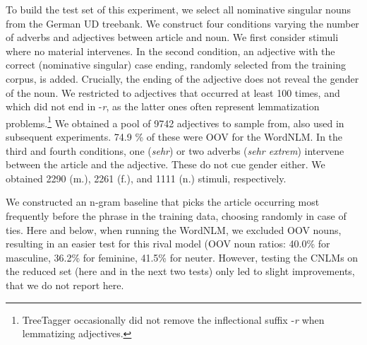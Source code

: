 To build the test set of this experiment, we select all nominative
singular nouns from the German UD
treebank. %
We construct four conditions varying the number of adverbs and
adjectives between article and noun.  We first consider stimuli where
no material
intervenes. %
In the second condition, an adjective with the correct (nominative
singular) case ending, randomly selected from the training corpus, is
added. Crucially, the ending of the adjective does not reveal the
gender of the noun.  We restricted to adjectives that occurred at
least 100 times, and which did not end in -\emph{r}, as the latter
ones often represent lemmatization problems.\footnote{TreeTagger
  occasionally did not remove the inflectional suffix -\emph{r} when
  lemmatizing adjectives.}  We obtained a pool of 9742 adjectives to
sample from, also used in subsequent experiments.  74.9 \% of these
were OOV for the WordNLM.  In the third and fourth conditions, one
(\emph{sehr}) or two adverbs (\emph{sehr extrem}) intervene between
the article and the adjective. These do not cue gender either. We
obtained 2290 (m.), 2261 (f.), and 1111 (n.) stimuli, respectively.

We constructed an n-gram baseline that picks the article occurring
most frequently before the phrase in the training data, choosing
randomly in case of ties. Here and below, when running the WordNLM, we
excluded OOV nouns, resulting in an easier test for this rival model
(OOV noun ratios: 40.0\% for masculine, 36.2\% for feminine, 41.5\%
for neuter. However, testing the CNLMs on the reduced set (here and in
the next two tests) only led to slight improvements, that we do not
report here.

